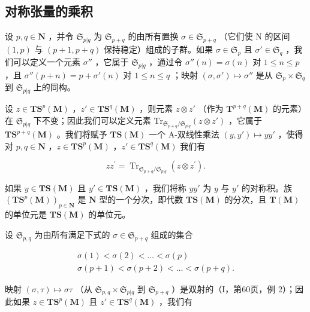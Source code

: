 \subsection{对称张量的乘积}

设 \(p, q \in \mathbf{N}\) ，并令 \(\mathfrak{S}_{p|q}\) 为 \(\mathfrak{S}_{p+q}\) 的由所有置换 \(\sigma \in \mathfrak{S}_{p+q}\) （它们使 N 的区间 \((1, p)\) 与 \((p+1, p+q)\) 保持稳定）组成的子群。如果 \(\sigma \in \mathfrak{S}_p\) 且 \(\sigma' \in \mathfrak{S}_q\) ，我们可以定义一个元素 \(\sigma''\) ，它属于 \(\mathfrak{S}_{p|q}\) ，通过令 \(\sigma''(n) = \sigma(n)\) 对 \(1 \leqslant n \leqslant p\) ，且 \(\sigma''(p+n) = p + \sigma'(n)\) 对 \(1 \leqslant n \leqslant q\) ；映射 \((\sigma, \sigma') \mapsto \sigma''\) 是从 \(\mathfrak{S}_p \times \mathfrak{S}_q\) 到 \(\mathfrak{S}_{p|q}\) 上的同构。

设 \(z \in \mathbf{TS}^p(\mathbf{M})\) ，\(z' \in \mathbf{TS}^q(\mathbf{M})\) ，则元素 \(z \otimes z'\) （作为 \(\mathbf{T}^{p + q}(\mathbf{M})\) 的元素）在 \(\mathfrak{S}_{p|q}\) 下不变；因此我们可以定义元素 \(\mathrm{Tr}_{\mathfrak{S}_{p + q}/\mathfrak{S}_{p|q}}(z \otimes z')\) ，它属于 \(\mathbf{TS}^{p + q}(\mathbf{M})\) 。我们将赋予 \(\mathbf{TS}(\mathbf{M})\) 一个 A-双线性乘法 \((y, y') \mapsto yy'\) ，使得对 \(p, q \in \mathbf{N}\) ，\(z \in \mathbf{TS}^p(\mathbf{M})\) ，\(z' \in \mathbf{TS}^q(\mathbf{M})\) 我们有

\[
z z ^ {\prime} = \operatorname{Tr} _ {\mathfrak {S} _ {p + q} / \mathfrak {S} _ {p | q}} (z \otimes z ^ {\prime}).\tag{4}
\]

如果 \(y \in \mathbf{TS}(\mathbf{M})\) 且 \(y' \in \mathbf{TS}(\mathbf{M})\) ，我们将称 \(yy'\) 为 \(y\) 与 \(y'\) 的对称积。族 \((\mathbf{TS}^p(\mathbf{M}))_{p \in \mathbf{N}}\) 是 \(\mathbf{N}\) 型的一个分次，即代数 \(\mathbf{TS}(\mathbf{M})\) 的分次，且 \(\mathbf{T}(\mathbf{M})\) 的单位元是 \(\mathbf{TS}(\mathbf{M})\) 的单位元。

设 \(\mathfrak{S}_{p,q}\) 为由所有满足下式的 \(\sigma \in \mathfrak{S}_{p + q}\) 组成的集合

\[
\begin{array}{l} \sigma (1) <   \sigma (2) <   \ldots <   \sigma (p) \\ \sigma (p + 1) <   \sigma (p + 2) <   \ldots <   \sigma (p + q). \end{array}
\]

映射 \((\sigma, \tau) \mapsto \sigma \tau\) （从 \(\mathfrak{S}_{p,q} \times \mathfrak{S}_{p|q}\) 到 \(\mathfrak{S}_{p+q}\) ）是双射的（I，第60页，例 2）；因此如果 \(z \in \mathbf{T}\mathbf{S}^p(\mathbf{M})\) 且 \(z' \in \mathbf{T}\mathbf{S}^q(\mathbf{M})\) ，我们有

